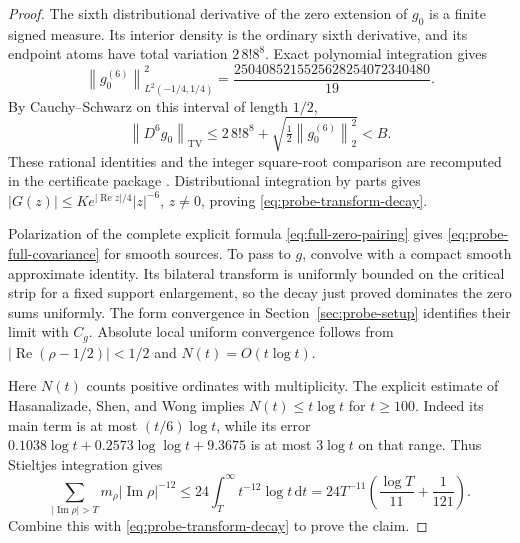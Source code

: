 \documentclass[11pt]{article}
\numberwithin{equation}{section}
\theoremstyle{definition}
\theoremstyle{remark}
\newcommand{\Rea}{\operatorname{Re}}
\newcommand{\Ima}{\operatorname{Im}}
\newcommand{\norm}[1]{\left\lVert #1\right\rVert}
\newcommand{\dd}{\,\mathrm d}
\begin{document}
\begin{proof}
The sixth distributional derivative of the zero extension of \(g_0\)
is a finite signed measure. Its interior density is the ordinary sixth
derivative, and its endpoint atoms have total variation \(2\,8!8^8\).
Exact polynomial integration gives
\[
\norm{g_0^{(6)}}_{L^2(-1/4,1/4)}^2
=\frac{2504085215525628254072340480}{19}.
\]
By Cauchy--Schwarz on this interval of length \(1/2\),
\[
\norm{D^6g_0}_{\mathrm{TV}}
\le2\,8!8^8+\sqrt{\tfrac12\norm{g_0^{(6)}}_2^2}<B.
\]
These rational identities and the integer square-root comparison are
recomputed in the certificate package \cite{GlobalGrowthCertificate}.
Distributional integration by parts gives
\(|G(z)|\le K e^{|\Rea z|/4}|z|^{-6}\), \(z\ne0\), proving
\eqref{eq:probe-transform-decay}.

Polarization of the complete explicit formula
\eqref{eq:full-zero-pairing} gives
\eqref{eq:probe-full-covariance} for smooth sources. To pass to \(g\),
convolve with a compact smooth approximate identity. Its bilateral
transform is uniformly bounded on the critical strip for a fixed support
enlargement, so the decay just proved dominates the zero sums uniformly.
The form convergence in Section~\ref{sec:probe-setup} identifies their
limit with \(C_g\). Absolute local uniform convergence follows from
\(|\Rea(\rho-1/2)|<1/2\) and \(N(t)=O(t\log t)\).

Here \(N(t)\) counts positive ordinates with multiplicity. The explicit
estimate of Hasanalizade, Shen, and Wong \cite[Corollary~1.2]{HSW}
implies \(N(t)\le t\log t\) for \(t\ge100\). Indeed its main term
is at most \((t/6)\log t\), while its error
\(0.1038\log t+0.2573\log\log t+9.3675\) is at most
\(3\log t\) on that range. Thus Stieltjes integration gives
\[
\sum_{|\Ima\rho|>T}m_\rho|\Ima\rho|^{-12}
\le24\int_T^\infty t^{-12}\log t\dd t
=24T^{-11}\left(\frac{\log T}{11}+\frac1{121}\right).
\]
Combine this with \eqref{eq:probe-transform-decay} to prove the claim.
\end{proof}
\end{document}

